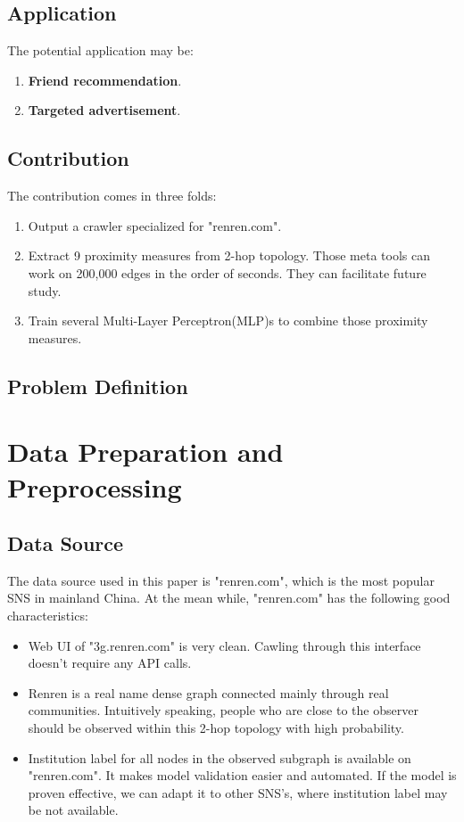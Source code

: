 \documentclass[11pt,a4paper]{article}
\begin{document}
\subsection{Application}

The potential application may be:
\begin{enumerate}
	\item \textbf{Friend recommendation}. 
	\item \textbf{Targeted advertisement}. 
\end{enumerate}

\subsection{Contribution}

The contribution comes in three folds:
\begin{enumerate}
	\item Output a crawler specialized for "renren.com". 
	\item Extract 9 proximity measures from 2-hop topology. 
	Those meta tools can work on 200,000 edges in the order 
	of seconds. They can facilitate future study. 
	\item Train several Multi-Layer Perceptron(MLP)s to 
	combine those proximity measures. 
\end{enumerate}

\subsection{Problem Definition}



\section{Data Preparation and Preprocessing}

\subsection{Data Source}

The data source used in this paper is "renren.com", which is the 
most popular SNS in mainland China. At the mean while, "renren.com" 
has the following good characteristics:
\begin{itemize}
	\item Web UI of "3g.renren.com" is very clean. Cawling through
	this interface doesn't require any API calls.  
	\item Renren is a real name dense graph connected mainly through 
	real communities. Intuitively speaking, 
	people who are close to the observer should be observed within 
	this 2-hop topology with high probability. 
	\item Institution label for all nodes in the observed subgraph
	is available on "renren.com". It makes model validation easier
	and automated. If the model is proven effective, we can adapt 
	it to other SNS's, where institution label may be not available.  
\end{itemize}
\end{document}
